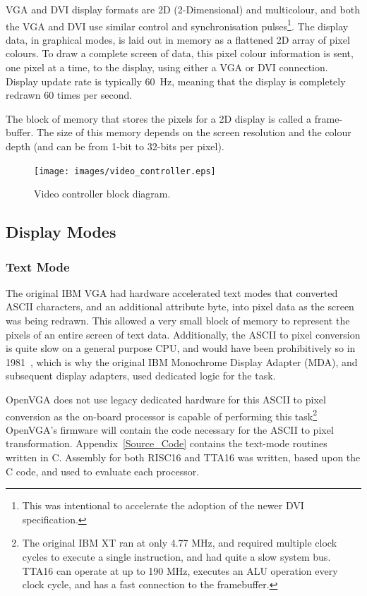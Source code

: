 VGA and DVI display formats are 2D (2-Dimensional) and multicolour, and both the
VGA and DVI use similar control and synchronisation pulses\footnote{This was
intentional to accelerate the adoption of the newer DVI
specification\cite{VESA_DVI}.}. The display data, in graphical modes, is laid out
in memory as a flattened 2D array of pixel colours. To draw a complete screen of
data, this pixel colour information is sent, one pixel at a time, to the display,
using either a VGA or DVI connection. Display update rate is typically 60~Hz,
meaning that the display is completely redrawn 60 times per second.

The block of memory that stores the pixels for a 2D display is called a
frame-buffer. The size of this memory depends on the screen resolution and the
colour depth (and can be from 1-bit to 32-bits per pixel).

\begin{figure}[h!]
\begin{center}
\texttt{[image: images/video\_controller.eps]}
\end{center}
\caption[Video controller block diagram]{Video controller block diagram.}
\label{VIDEO_Ctrl}
\end{figure}


\subsection{Display Modes}

\subsubsection{Text Mode}
The original IBM VGA had hardware accelerated text modes that converted ASCII
characters, and an additional attribute byte, into pixel data as the screen was
being redrawn. This allowed a very small block of memory to represent the pixels
of an entire screen of text data. Additionally, the ASCII to pixel conversion is
quite slow on a general purpose CPU, and would have been prohibitively so in
1981~\cite{VGA_Programmers}, which is why the original IBM Monochrome Display
Adapter (MDA), and subsequent display adapters, used dedicated logic for the
task.

OpenVGA does not use legacy dedicated hardware for this ASCII to pixel conversion
as the on-board processor is capable of performing this task\footnote{The
original IBM XT ran at only 4.77 MHz, and required multiple clock cycles to
execute a single instruction, and had quite a slow system bus\cite{SVGA_Book}.
TTA16 can operate at up to 190 MHz, executes an ALU operation every clock cycle,
and has a fast connection to the framebuffer.} OpenVGA's firmware will contain
the code necessary for the ASCII to pixel transformation.
Appendix~\ref{Source_Code} contains the text-mode routines written in C. Assembly
for both RISC16 and TTA16 was written, based upon the C code, and used to
evaluate each processor.

